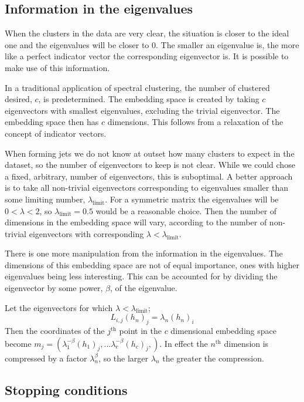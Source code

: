 \subsection{Information in the eigenvalues}\label{sec:eig_norm}
When the clusters in the data are very clear, the situation is closer to the ideal one and the eigenvalues will be closer to \(0\).
The smaller an eigenvalue is, the more like a perfect indicator vector the corresponding eigenvector is.
It is possible to make use of this information.

In a traditional application of spectral clustering, the number of clustered desired, \(c\), is predetermined.
The embedding space is created by taking \(c\) eigenvectors with smallest eigenvalues, excluding the trivial eigenvector.
The embedding space then has \(c\) dimensions.
This follows from a relaxation of the concept of indicator vectors.

When forming jets we do not know at outset how many clusters to expect in the dataset,
so the number of eigenvectors to keep is not clear.
While we could chose a fixed, arbitrary, number of eigenvectors, this is suboptimal.
A better approach is to take all non-trivial eigenvectors corresponding to eigenvalues
smaller than some limiting number, \(\lambda_\text{limit}\).
For a symmetric matrix the eigenvalues will be \(0 < \lambda < 2\),
so \(\lambda_\text{limit} = 0.5\) would be a reasonable choice.
Then the number of dimensions in the embedding space will vary,
according to the number of non-trivial eigenvectors with corresponding \(\lambda < \lambda_\text{limit}\).

There is one more manipulation from the information in the eigenvalues.
The dimensions of this embedding space are not of equal importance,
ones with higher eigenvalues being less interesting.
This can be accounted for by dividing the eigenvector by some power, \(\beta\), of the eigenvalue.

Let the eigenvectors for which \(\lambda < \lambda_\text{limit}\);
\begin{equation}
    L_{i, j} (h_n)_j = \lambda_n (h_n)_i
\end{equation}
Then the coordinates of the \(j^\text{th}\) point in the \(c\) dimensional embedding space
become \(m_j = \left(\lambda_1^{-\beta} (h_1)_j, \dots \lambda_c^{-\beta} (h_c)_j,\right)\).
In effect the \(n^\text{th}\) dimension is compressed by a factor \(\lambda_n^\beta\),
so the larger \(\lambda_n\) the greater the compression.

\subsection{Stopping conditions}\label{sec:stopping_condintion}


